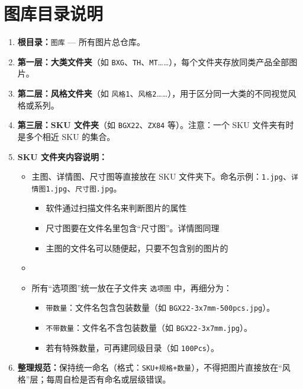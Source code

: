 \documentclass[UTF8]{ctexart}
\begin{document}
\section*{图库目录说明}
\begin{enumerate}
  \item \textbf{根目录：}\verb|图库| — 所有图片总仓库。
  \item \textbf{第一层：大类文件夹}（如 \verb|BXG|、\verb|TH|、\verb|MT|……），每个文件夹存放同类产品全部图片。
  \item \textbf{第二层：风格文件夹}（如 \verb|风格1|、\verb|风格2|……），用于区分同一大类的不同视觉风格或系列。
  \item \textbf{第三层：SKU 文件夹}（如 \verb|BGX22|、\verb|ZX84| 等）。注意：一个 SKU 文件夹有时是多个相近 SKU 的集合。
  \item \textbf{SKU 文件夹内容说明：}
    \begin{itemize}
      \item 主图、详情图、尺寸图等直接放在 SKU 文件夹下。命名示例：\verb|1.jpg|、\verb|详情图1.jpg|、\verb|尺寸图.jpg|。
        \begin{itemize}
          \item 软件通过扫描文件名来判断图片的属性
          \item 尺寸图要在文件名里包含“尺寸图”。详情图同理
          \item 主图的文件名可以随便起，只要不包含别的图片的
        \end{itemize}
      \item 
      \item 所有“选项图”统一放在子文件夹 \verb|选项图| 中，再细分为：
        \begin{itemize}
          \item \verb|带数量|：文件名包含包装数量（如 \verb|BGX22-3x7mm-500pcs.jpg|）。
          \item \verb|不带数量|：文件名不含包装数量（如 \verb|BGX22-3x7mm.jpg|）。
          \item 若有特殊数量，可再建同级目录（如 \verb|100Pcs|）。
        \end{itemize}
    \end{itemize}
  \item \textbf{整理规范：}保持统一命名（格式：\verb|SKU+规格+数量|），不得把图片直接放在“风格”层；每周自检是否有命名或层级错误。
\end{enumerate}


\end{document}
